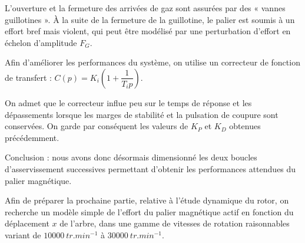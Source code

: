 L'ouverture et la fermeture des arrivées de gaz sont assurées par des « vannes
guillotines ». À la suite de la fermeture de la guillotine, le palier est soumis à un
effort bref mais violent, qui peut être modélisé par une perturbation d'effort en
échelon d'amplitude $F_G$.

\ifprof
\else 
\fi

Afin d'améliorer les performances du système, on utilise un correcteur de fonction
de transfert : $C(p)=K_i \left( 1+\dfrac{1}{T_i p}\right)$.

\ifprof
\else 
\fi

\ifprof
\else 
\fi


On admet que le correcteur influe peu sur le temps de réponse et les dépassements
lorsque les marges de stabilité et la pulsation de coupure sont conservées.
On garde par conséquent les valeurs de $K_P$ et $K_D$ obtenues précédemment.

Conclusion : nous avons donc désormais dimensionné les deux boucles d'asservissement
successives permettant d'obtenir les performances attendues du palier
magnétique.

Afin de préparer la prochaine partie, relative à l'étude dynamique du rotor, on
recherche un modèle simple de l'effort du palier magnétique actif en fonction du
déplacement $x$ de l'arbre, dans une gamme de vitesses de rotation raisonnables
variant de $\SI{10000}{tr.min^{-1}}$ à $\SI{30000}{tr.min^{-1}}$.



\ifprof
\else 
\fi



\ifprof
\else

